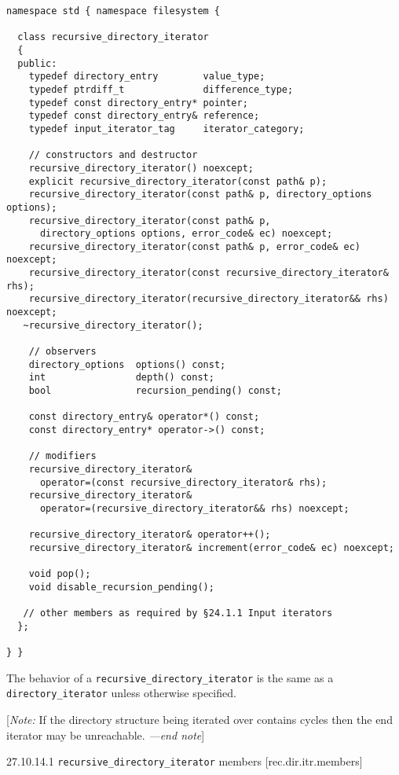 \begin{verbatim}
namespace std { namespace filesystem {

  class recursive_directory_iterator 
  {
  public:
    typedef directory_entry        value_type;
    typedef ptrdiff_t              difference_type;
    typedef const directory_entry* pointer;
    typedef const directory_entry& reference;
    typedef input_iterator_tag     iterator_category;

    // constructors and destructor
    recursive_directory_iterator() noexcept;
    explicit recursive_directory_iterator(const path& p);
    recursive_directory_iterator(const path& p, directory_options options);
    recursive_directory_iterator(const path& p,
      directory_options options, error_code& ec) noexcept;
    recursive_directory_iterator(const path& p, error_code& ec) noexcept;
    recursive_directory_iterator(const recursive_directory_iterator& rhs);
    recursive_directory_iterator(recursive_directory_iterator&& rhs) noexcept;
   ~recursive_directory_iterator();

    // observers
    directory_options  options() const;
    int                depth() const;
    bool               recursion_pending() const;

    const directory_entry& operator*() const;
    const directory_entry* operator->() const;

    // modifiers
    recursive_directory_iterator&
      operator=(const recursive_directory_iterator& rhs);
    recursive_directory_iterator&
      operator=(recursive_directory_iterator&& rhs) noexcept;

    recursive_directory_iterator& operator++();
    recursive_directory_iterator& increment(error_code& ec) noexcept;

    void pop();
    void disable_recursion_pending();

   // other members as required by §24.1.1 Input iterators
  };

} }
\end{verbatim}

The behavior of a \texttt{recursive\_directory\_iterator} is the same as
a \texttt{directory\_iterator} unless otherwise specified.

{[}\emph{Note:} If the directory structure being iterated over contains
cycles then the end iterator may be unreachable. \emph{---end note}{]}

27.10.14.1 \texttt{recursive\_directory\_iterator} members
{[}rec.dir.itr.members{]}


